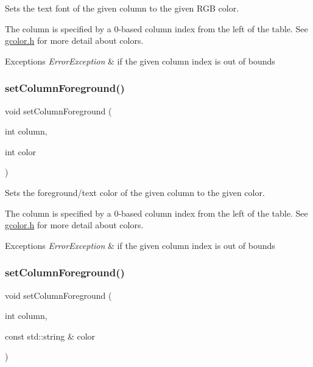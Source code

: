 Sets the text font of the given column to the given R\+GB color. 

The column is specified by a 0-\/based column index from the left of the table. See \mbox{\hyperlink{gcolor_8h_source}{gcolor.\+h}} for more detail about colors. 
\begin{DoxyExceptions}{Exceptions}
{\em Error\+Exception} & if the given column index is out of bounds \\
\hline
\end{DoxyExceptions}
\mbox{\label{classGTable_aa616c02b04beb6ca757dec04f46814b0}} 
\subsubsection{\texorpdfstring{set\+Column\+Foreground()}{setColumnForeground()}\hspace{0.1cm}{\footnotesize\ttfamily [1/2]}}
{\footnotesize\ttfamily void set\+Column\+Foreground (\begin{DoxyParamCaption}\item[{int}]{column,  }\item[{int}]{color }\end{DoxyParamCaption})\hspace{0.3cm}{\ttfamily [virtual]}}



Sets the foreground/text color of the given column to the given color. 

The column is specified by a 0-\/based column index from the left of the table. See \mbox{\hyperlink{gcolor_8h_source}{gcolor.\+h}} for more detail about colors. 
\begin{DoxyExceptions}{Exceptions}
{\em Error\+Exception} & if the given column index is out of bounds \\
\hline
\end{DoxyExceptions}
\mbox{\label{classGTable_a84ca08c2995646ab28c78bffbcdc2693}} 
\subsubsection{\texorpdfstring{set\+Column\+Foreground()}{setColumnForeground()}\hspace{0.1cm}{\footnotesize\ttfamily [2/2]}}
{\footnotesize\ttfamily void set\+Column\+Foreground (\begin{DoxyParamCaption}\item[{int}]{column,  }\item[{const std\+::string \&}]{color }\end{DoxyParamCaption})\hspace{0.3cm}{\ttfamily [virtual]}}



